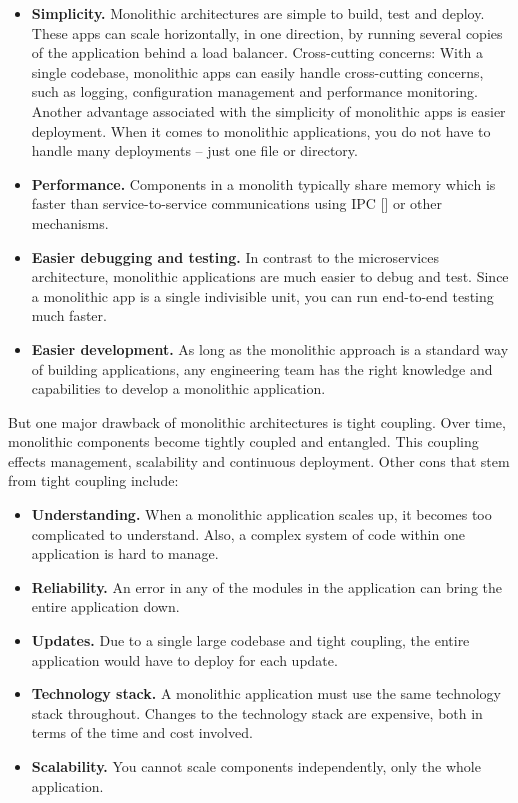 \begin{itemize}
    \item \textbf{Simplicity.} Monolithic architectures are simple to build, test and deploy.
    These apps can scale horizontally, in one direction, by running several copies of the application behind a load balancer.
    Cross-cutting concerns: With a single codebase, monolithic apps can easily handle cross-cutting concerns, such as logging,
    configuration management and performance monitoring.
    Another advantage associated with the simplicity of monolithic apps is easier deployment.
    When it comes to monolithic applications, you do not have to handle many deployments – just one file or directory.
    \item \textbf{Performance.} Components in a monolith typically share memory which is faster than service-to-service
    communications using IPC [\cite{proctor1999linux}] or other mechanisms.
    \item \textbf{Easier debugging and testing.}
    In contrast to the microservices architecture, monolithic applications are much easier to debug and test.
    Since a monolithic app is a single indivisible unit, you can run end-to-end testing much faster.
    \item \textbf{Easier development.} As long as the monolithic approach is a standard way of building applications,
    any engineering team has the right knowledge and capabilities to develop a monolithic application.
\end{itemize}
But one major drawback of monolithic architectures is tight coupling.
Over time, monolithic components become tightly coupled and entangled.
This coupling effects management, scalability and continuous deployment.
Other cons that stem from tight coupling include:
\begin{itemize}
    \item \textbf{Understanding.} When a monolithic application scales up, it becomes too complicated to understand.
    Also, a complex system of code within one application is hard to manage.
    \item \textbf{Reliability.} An error in any of the modules in the application can bring the entire application down.
    \item \textbf{Updates.} Due to a single large codebase and tight coupling, the entire application would have to deploy
    for each update.
    \item \textbf{Technology stack.} A monolithic application must use the same technology stack throughout.
    Changes to the technology stack are expensive, both in terms of the time and cost involved.
    \item \textbf{Scalability.} You cannot scale components independently, only the whole application.
\end{itemize}

